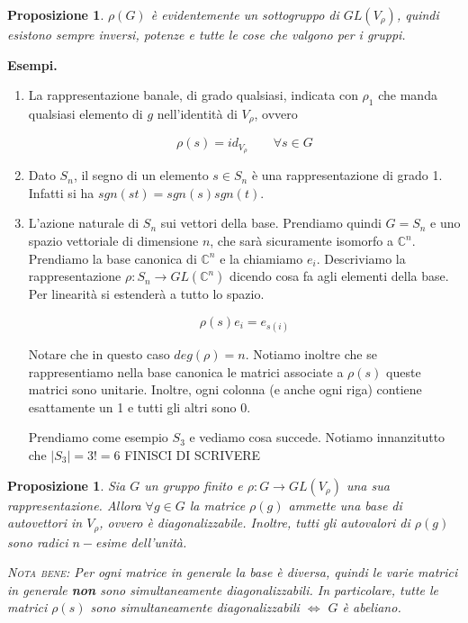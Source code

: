 \documentclass[11pt]{article}
\theoremstyle{plain}
\newtheorem{prop}[thm]{Proposizione}
\theoremstyle{definition}
\theoremstyle{remark}
\newcommand{\C}{\mathbb{C}}
\begin{document}
\begin{prop} $\rho(G)$ è evidentemente un sottogruppo di $GL(V_\rho)$, quindi esistono sempre inversi, potenze e tutte le cose che valgono per i gruppi.

\end{prop}


\textbf{Esempi.}
\begin{enumerate}
	\item La rappresentazione banale, di grado qualsiasi, indicata con $\rho_1$ che manda qualsiasi elemento di $g$ nell'identità di $V_\rho$, ovvero
	
	\[ \rho(s ) = id_{V_\rho} \qquad \forall s \in G\]
	\item Dato $S_n$, il segno di un elemento $s\in S_n$ è una rappresentazione di grado 1. Infatti si ha $sgn(st) = sgn(s) sgn(t)$.
	\item L'azione naturale di $S_n$ sui vettori della base. Prendiamo quindi $G = S_n$ e uno spazio vettoriale di dimensione $n$, che sarà sicuramente isomorfo a $\C^n$. Prendiamo la base canonica di $\C^n$ e la chiamiamo $e_i$. Descriviamo la rappresentazione $\rho: S_n \to GL(\C^n)$ dicendo cosa fa agli elementi della base. Per linearità si estenderà a tutto lo spazio.
	
	\[ \rho(s) e_i = e_{s(i)}\]
	
	Notare che in questo caso $deg(\rho) = n$. Notiamo inoltre che se rappresentiamo nella base canonica le matrici associate a $\rho(s)$ queste matrici sono unitarie. Inoltre, ogni colonna (e anche ogni riga) contiene esattamente un 1 e tutti gli altri sono 0.
	
	Prendiamo come esempio $S_3$ e vediamo cosa succede. Notiamo innanzitutto che $ |S_3| = 3! = 6$
	FINISCI DI SCRIVERE
\end{enumerate}








\begin{prop}
Sia $G$ un gruppo finito e $\rho: G \to GL(V_\rho)$ una sua rappresentazione. Allora $\forall g \in G$ la matrice $\rho(g)$ ammette una base di autovettori in $V_\rho$, ovvero è diagonalizzabile. Inoltre, tutti gli autovalori di $\rho(g)$ sono radici $n-$esime dell'unità.

\textsc{Nota bene:} Per ogni matrice in generale la base è diversa, quindi le varie matrici in generale \textbf{non} sono simultaneamente diagonalizzabili. In particolare, tutte le matrici $\rho(s)$ sono simultaneamente diagonalizzabili $\Leftrightarrow$ $G$ è abeliano. 

\label{prop:diagonalizzabilita rappresentazioni}
\end{prop}
\end{document}
